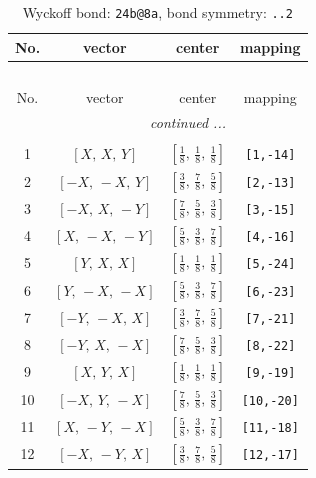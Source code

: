 \documentclass[fleqn,8pt]{jsarticle}
\begin{document}
\begin{longtable}{cccc}
\caption{Wyckoff bond: {\tt 24b@8a}, bond symmetry: {\tt ..2}}
 \\
 \hline \hline
No. & vector & center & mapping \\ \hline \endfirsthead

\multicolumn{3}{l}{\tablename\ \thetable{}} \\
 \hline \hline
No. & vector & center & mapping \\ \hline \endhead

 \hline \hline
\multicolumn{3}{r}{\footnotesize\it continued ...} \\ \endfoot

 \hline \hline
\multicolumn{3}{r}{} \\ \endlastfoot

1 & $\left[ X,\, X,\, Y \right]$ & $\left[ \frac{1}{8},\, \frac{1}{8},\, \frac{1}{8} \right]$ & {\tt [1,-14]} \\ \hline
2 & $\left[ - X,\, - X,\, Y \right]$ & $\left[ \frac{3}{8},\, \frac{7}{8},\, \frac{5}{8} \right]$ & {\tt [2,-13]} \\ \hline
3 & $\left[ - X,\, X,\, - Y \right]$ & $\left[ \frac{7}{8},\, \frac{5}{8},\, \frac{3}{8} \right]$ & {\tt [3,-15]} \\ \hline
4 & $\left[ X,\, - X,\, - Y \right]$ & $\left[ \frac{5}{8},\, \frac{3}{8},\, \frac{7}{8} \right]$ & {\tt [4,-16]} \\ \hline
5 & $\left[ Y,\, X,\, X \right]$ & $\left[ \frac{1}{8},\, \frac{1}{8},\, \frac{1}{8} \right]$ & {\tt [5,-24]} \\ \hline
6 & $\left[ Y,\, - X,\, - X \right]$ & $\left[ \frac{5}{8},\, \frac{3}{8},\, \frac{7}{8} \right]$ & {\tt [6,-23]} \\ \hline
7 & $\left[ - Y,\, - X,\, X \right]$ & $\left[ \frac{3}{8},\, \frac{7}{8},\, \frac{5}{8} \right]$ & {\tt [7,-21]} \\ \hline
8 & $\left[ - Y,\, X,\, - X \right]$ & $\left[ \frac{7}{8},\, \frac{5}{8},\, \frac{3}{8} \right]$ & {\tt [8,-22]} \\ \hline
9 & $\left[ X,\, Y,\, X \right]$ & $\left[ \frac{1}{8},\, \frac{1}{8},\, \frac{1}{8} \right]$ & {\tt [9,-19]} \\ \hline
10 & $\left[ - X,\, Y,\, - X \right]$ & $\left[ \frac{7}{8},\, \frac{5}{8},\, \frac{3}{8} \right]$ & {\tt [10,-20]} \\ \hline
11 & $\left[ X,\, - Y,\, - X \right]$ & $\left[ \frac{5}{8},\, \frac{3}{8},\, \frac{7}{8} \right]$ & {\tt [11,-18]} \\ \hline
12 & $\left[ - X,\, - Y,\, X \right]$ & $\left[ \frac{3}{8},\, \frac{7}{8},\, \frac{5}{8} \right]$ & {\tt [12,-17]} \\
\end{longtable}
\end{document}
